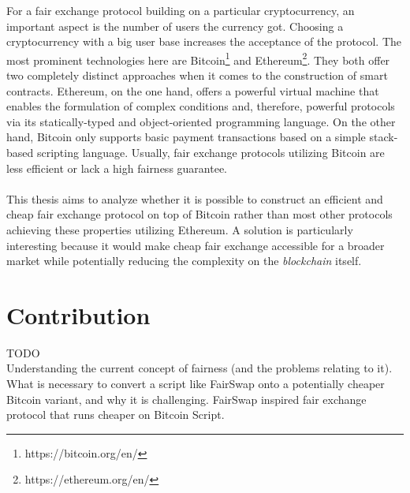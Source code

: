 \documentclass{cacthesis}
\newcounter{protocol}
\begin{document}
        For a fair exchange protocol building on a particular cryptocurrency, an important aspect is the number of users the currency got. Choosing a cryptocurrency with a big user base increases the acceptance of the protocol. The most prominent technologies here are Bitcoin\footnote{https://bitcoin.org/en/} and Ethereum\footnote{https://ethereum.org/en/}. They both offer two completely distinct approaches when it comes to the construction of smart contracts. Ethereum, on the one hand, offers a powerful virtual machine that enables the formulation of complex conditions and, therefore, powerful protocols via its statically-typed and object-oriented programming language. On the other hand, Bitcoin only supports basic payment transactions based on a simple stack-based scripting language. Usually, fair exchange protocols utilizing Bitcoin are less efficient or lack a high fairness guarantee. \\\\
        This thesis aims to analyze whether it is possible to construct an efficient and cheap fair exchange protocol on top of Bitcoin rather than most other protocols achieving these properties utilizing Ethereum. A solution is particularly interesting because it would make cheap fair exchange accessible for a broader market while potentially reducing the complexity on the \textit{blockchain} itself.
        
        \section{Contribution}
        TODO \\
        Understanding the current concept of fairness (and the problems relating to it). \\
        What is necessary to convert a script like FairSwap onto a potentially cheaper Bitcoin variant, and why it is challenging.
        FairSwap inspired fair exchange protocol that runs cheaper on Bitcoin Script.
        
\end{document}
